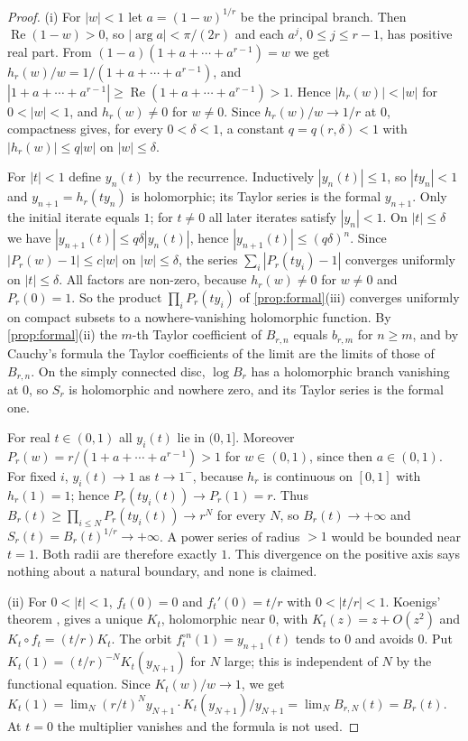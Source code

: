 \documentclass[11pt,reqno]{amsart}
\theoremstyle{definition}
\theoremstyle{remark}
\theoremstyle{plain}
\begin{document}
\begin{proof}
(i) For $|w|<1$ let $a=(1-w)^{1/r}$ be the principal branch. Then $\operatorname{Re}(1-w)>0$, so $|\arg a|<\pi/(2r)$ and each $a^j$, $0\le j\le r-1$, has positive real part. From $(1-a)(1+a+\cdots+a^{r-1})=w$ we get $h_r(w)/w=1/(1+a+\cdots+a^{r-1})$, and $|1+a+\cdots+a^{r-1}|\ge\operatorname{Re}(1+a+\cdots+a^{r-1})>1$. Hence $|h_r(w)|<|w|$ for $0<|w|<1$, and $h_r(w)\ne0$ for $w\ne0$. Since $h_r(w)/w\to1/r$ at $0$, compactness gives, for every $0<\delta<1$, a constant $q=q(r,\delta)<1$ with $|h_r(w)|\le q|w|$ on $|w|\le\delta$.

For $|t|<1$ define $y_n(t)$ by the recurrence. Inductively $|y_n(t)|\le1$, so $|ty_n|<1$ and $y_{n+1}=h_r(ty_n)$ is holomorphic; its Taylor series is the formal $y_{n+1}$. Only the initial iterate equals $1$; for $t\ne0$ all later iterates satisfy $|y_n|<1$. On $|t|\le\delta$ we have $|y_{n+1}(t)|\le q\delta|y_n(t)|$, hence $|y_{n+1}(t)|\le(q\delta)^n$. Since $|P_r(w)-1|\le c|w|$ on $|w|\le\delta$, the series $\sum_i|P_r(ty_i)-1|$ converges uniformly on $|t|\le\delta$. All factors are non-zero, because $h_r(w)\ne0$ for $w\ne0$ and $P_r(0)=1$. So the product $\prod_iP_r(ty_i)$ of \cref{prop:formal}(iii) converges uniformly on compact subsets to a nowhere-vanishing holomorphic function. By \cref{prop:formal}(ii) the $m$-th Taylor coefficient of $B_{r,n}$ equals $b_{r,m}$ for $n\ge m$, and by Cauchy's formula the Taylor coefficients of the limit are the limits of those of $B_{r,n}$. On the simply connected disc, $\log B_r$ has a holomorphic branch vanishing at $0$, so $S_r$ is holomorphic and nowhere zero, and its Taylor series is the formal one.

For real $t\in(0,1)$ all $y_i(t)$ lie in $(0,1]$. Moreover $P_r(w)=r/(1+a+\cdots+a^{r-1})>1$ for $w\in(0,1)$, since then $a\in(0,1)$. For fixed $i$, $y_i(t)\to1$ as $t\to1^-$, because $h_r$ is continuous on $[0,1]$ with $h_r(1)=1$; hence $P_r(ty_i(t))\to P_r(1)=r$. Thus $B_r(t)\ge\prod_{i\le N}P_r(ty_i(t))\to r^N$ for every $N$, so $B_r(t)\to+\infty$ and $S_r(t)=B_r(t)^{1/r}\to+\infty$. A power series of radius $>1$ would be bounded near $t=1$. Both radii are therefore exactly $1$. This divergence on the positive axis says nothing about a natural boundary, and none is claimed.

(ii) For $0<|t|<1$, $f_t(0)=0$ and $f_t'(0)=t/r$ with $0<|t/r|<1$. Koenigs' theorem \cite{Koenigs1884}, \cite[\S6, Thm.~6.1]{Milnor1991} gives a unique $K_t$, holomorphic near $0$, with $K_t(z)=z+O(z^2)$ and $K_t\circ f_t=(t/r)K_t$. The orbit $f_t^{\circ n}(1)=y_{n+1}(t)$ tends to $0$ and avoids $0$. Put $K_t(1)=(t/r)^{-N}K_t(y_{N+1})$ for $N$ large; this is independent of $N$ by the functional equation. Since $K_t(w)/w\to1$, we get $K_t(1)=\lim_N(r/t)^Ny_{N+1}\cdot K_t(y_{N+1})/y_{N+1}=\lim_NB_{r,N}(t)=B_r(t)$. At $t=0$ the multiplier vanishes and the formula is not used.


\end{proof}
\end{document}
